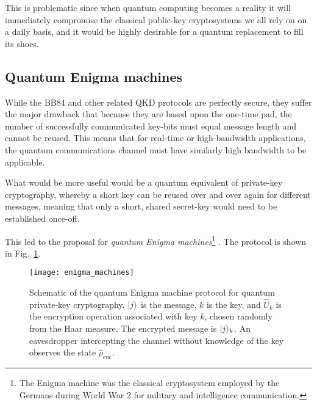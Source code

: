 This is problematic since when quantum computing becomes a reality it will immediately compromise the classical public-key cryptosystems we all rely on on a daily basis, and it would be highly desirable for a quantum replacement to fill its shoes.

%
%

\subsection{Quantum Enigma machines}

While the BB84 and other related QKD protocols are perfectly secure, they suffer the major drawback that because they are based upon the one-time pad, the number of successfully communicated key-bits must equal message length and cannot be reused. This means that for real-time or high-bandwidth applications, the quantum communications channel must have similarly high bandwidth to be applicable.

What would be more useful would be a quantum equivalent of private-key cryptography, whereby a short key can be reused over and over again for different messages, meaning that only a short, shared secret-key would need to be established once-off.

This led to the proposal for \textit{quantum Enigma machines}\footnote{The Enigma machine was the classical cryptosystem employed by the Germans during World War 2 for military and intelligence communication.} \cite{bib:LloydEnigma}. The protocol is shown in Fig.~\ref{fig:enigma}.

\begin{figure}[!htbp]
\texttt{[image: enigma\_machines]}
\captionspacefig \caption{Schematic of the quantum Enigma machine protocol for quantum private-key cryptography. $|j\rangle$ is the message, $k$ is the key, and $\hat{U}_k$ is the encryption operation associated with key $k$, chosen randomly from the Haar measure. The encrypted message is $|j\rangle_k$. An eavesdropper intercepting the channel without knowledge of the key observes the state $\hat\rho_\mathrm{enc}$.}\label{fig:enigma}	
\end{figure}

